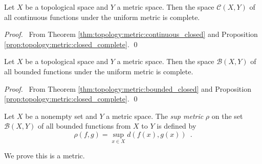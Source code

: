 \begin{thm}
  Let $X$ be a topological space and $Y$ a metric space. Then the space $\mathcal{C}(X, Y)$ of all continuous functions under the uniform metric is complete.
\end{thm}

\begin{proof}
  \pf\ From Theorem \ref{thm:topology:metric:continuous_closed} and Proposition \ref{prop:topology:metric:closed_complete}. \qed
\end{proof}

\begin{thm}
  Let $X$ be a topological space and $Y$ a metric space. Then the space $\mathcal{B}(X, Y)$ of all bounded functions under the uniform metric is complete.
\end{thm}

\begin{proof}
  \pf\ From Theorem \ref{thm:topology:metric:bounded_closed} and Proposition \ref{prop:topology:metric:closed_complete}. \qed
\end{proof}

\begin{df}
  Let $X$ be a nonempty set and $Y$ a metric space. The \emph{sup metric} $\rho$ on the set $\mathcal{B}(X, Y)$ of all bounded functions from $X$ to $Y$ is defined by
  \[ \rho(f, g) = \sup_{x \in X} d(f(x), g(x)) \enspace . \]

  We prove this is a metric.
\end{df}

